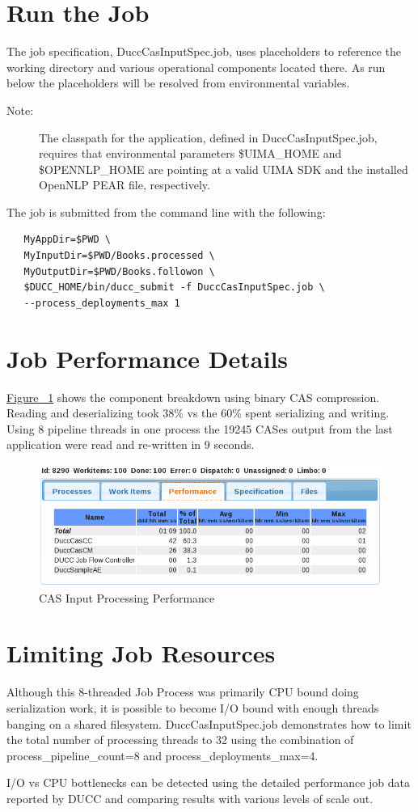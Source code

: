 \section{Run the Job}
The job specification, DuccCasInputSpec.job, uses placeholders to reference the working directory
and various operational components located there. As run below the placeholders will be resolved
from environmental variables. 

	\begin{description}
    \item[Note:] The classpath for the application, defined in DuccCasInputSpec.job, requires that environmental parameters 
    \$UIMA\_HOME and \$OPENNLP\_HOME are pointing at a valid UIMA SDK and the installed OpenNLP PEAR file, respectively. 
	\end{description}

The job is submitted from the command line with the following:
\begin{verbatim}
   MyAppDir=$PWD \
   MyInputDir=$PWD/Books.processed \ 
   MyOutputDir=$PWD/Books.followon \
   $DUCC_HOME/bin/ducc_submit -f DuccCasInputSpec.job \
   --process_deployments_max 1
\end{verbatim}

\section{Job Performance Details}
\hyperref[fig:CAS-Input-Processing]{Figure ~\ref{fig:CAS-Input-Processing}} shows the component breakdown
using binary CAS compression. Reading and deserializing took 38\% vs the 60\% spent serializing and writing.
Using 8 pipeline threads in one process the 19245 CASes output from the last application were read and 
re-written in 9 seconds.

\begin{figure}[H]
  \centering
  \includegraphics[width=5.5in]{images/BooksCasPerf.png}
  \caption{CAS Input Processing Performance}
  \label{fig:CAS-Input-Processing}
\end{figure}

\section{Limiting Job Resources}
Although this 8-threaded Job Process was primarily CPU bound doing serialization work, it is possible to become I/O bound 
with enough threads banging on a shared filesystem.
DuccCasInputSpec.job demonstrates how to limit the total number of processing threads to 32 using the combination 
of process\_pipeline\_count=8 and process\_deployments\_max=4.

I/O vs CPU bottlenecks can be detected using the detailed performance job data reported by DUCC and comparing results
with various levels of scale out.
